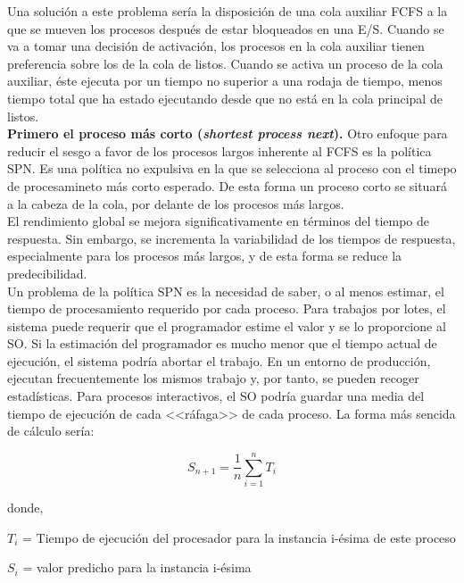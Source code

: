 \documentclass{article}
\begin{document}
				Una solución a este problema sería la disposición de una cola auxiliar FCFS a la que se mueven los procesos después de estar bloqueados en una E/S. Cuando se va a tomar una decisión de activación, los procesos en la cola auxiliar tienen preferencia sobre los de la cola de listos. Cuando se activa un proceso de la cola auxiliar, éste ejecuta por un tiempo no superior a una rodaja de tiempo, menos tiempo total que ha estado ejecutando desde que no está en la cola principal de listos.  \\
				
				\textbf{Primero el proceso más corto (\textit{shortest process next}).} Otro enfoque para reducir el sesgo a favor de los procesos largos inherente al FCFS es la política SPN. Es una política no expulsiva en la que se selecciona al proceso con el timepo de procesamineto más corto esperado. De esta forma un proceso corto se situará a la cabeza de la cola, por delante de los procesos más largos. \\
				
				El rendimiento global se mejora significativamente en términos del tiempo de respuesta. Sin embargo, se incrementa la variabilidad de los tiempos de respuesta, especialmente para los procesos más largos, y de esta forma se reduce la predecibilidad.  \\
				
				Un problema de la política SPN es la necesidad de saber, o al menos estimar, el tiempo de procesamiento requerido por cada proceso. Para trabajos por lotes, el sistema puede requerir que el programador estime el valor y se lo proporcione al SO. Si la estimación del programador es mucho menor que el tiempo actual de ejecución, el sistema podría abortar el trabajo. En un entorno de producción, ejecutan frecuentemente los mismos trabajo y, por tanto, se pueden recoger estadísticas. Para procesos interactivos, el SO podría guardar una media del tiempo de ejecución de cada <<ráfaga>> de cada proceso. La forma más sencida de cálculo sería:
				
				\begin{equation}
				S_{n+1} = \frac{1}{n}\sum_{i=1}^{n}T_{i}
				\end{equation}
				
				donde, 
				
				$T_{i}$ = Tiempo de ejecución del procesador para la instancia i-ésima de este proceso
				
				$S_{i}$ = valor predicho para la instancia i-ésima
				
\end{document}
